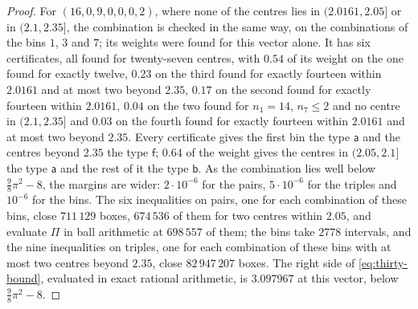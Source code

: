 \documentclass[11pt,reqno]{amsart}
\renewcommand{\_}{\origunderscore\allowbreak}
\numberwithin{equation}{section}
\theoremstyle{plain}
\theoremstyle{definition}
\theoremstyle{remark}
\begin{document}
\begin{proof}
For $(16,0,9,0,0,0,2)$, where none of the centres lies in
$(2.0161,2.05]$ or in $(2.1,2.35]$, the combination is checked in the same
way, on the combinations of the bins $1$, $3$ and $7$; its weights were
found for this vector alone. It has six certificates, all found for
twenty-seven centres, with $0.54$ of its weight on the one found for
exactly twelve, $0.23$ on the third found for exactly fourteen within
$2.0161$ and at most two beyond $2.35$, $0.17$ on the second found for
exactly fourteen within $2.0161$, $0.04$ on the two found for $n_1=14$,
$n_7\le2$ and no centre in $(2.1,2.35]$ and $0.03$ on the fourth found for
exactly fourteen within $2.0161$ and at most two beyond $2.35$. Every
certificate gives the first bin the type $\mathsf a$ and the centres
beyond $2.35$ the type $\mathsf f$; $0.64$ of the weight gives the centres
in $(2.05,2.1]$ the type $\mathsf a$ and the rest of it the type
$\mathsf b$. As the combination lies well below $\frac98\pi^2-8$, the
margins are wider: $2\cdot10^{-6}$ for the pairs, $5\cdot10^{-6}$ for the
triples and $10^{-6}$ for the bins. The six inequalities on pairs, one for
each combination of these bins, close $711\,129$ boxes, $674\,536$ of them
for two centres within $2.05$, and evaluate $\Pi$ in ball arithmetic at
$698\,557$ of them; the bins take $2778$ intervals, and the nine
inequalities on triples, one for each combination of these bins with at
most two centres beyond $2.35$, close $82\,947\,207$ boxes. The right side
of \eqref{eq:thirty-bound}, evaluated in exact rational arithmetic, is
$3.097967$ at this vector, below $\frac98\pi^2-8$.


\end{proof}
\end{document}
